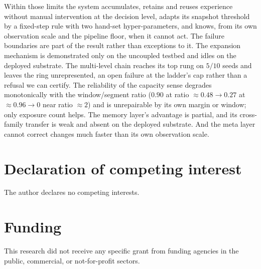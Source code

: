 \documentclass[preprint,12pt]{elsarticle}
\begin{document}
Within those limits the
system accumulates, retains and reuses experience without manual
intervention at the decision level, adapts its snapshot threshold by a
fixed-step rule with two hand-set hyper-parameters, and
knows, from its own observation scale and the pipeline floor, when it
cannot act. The failure boundaries are part of the result rather than
exceptions to it. The expansion mechanism is demonstrated only on the
uncoupled testbed and idles on the deployed substrate. The multi-level chain
reaches its top rung on $5/10$ seeds and leaves the ring unrepresented, an
open failure at the ladder's cap rather than a refusal we can certify. The
reliability of the capacity sense degrades monotonically with the
window/segment ratio ($0.90$ at ratio $\approx0.48\to0.27$ at
$\approx0.96\to0$ near ratio $\approx2$) and is unrepairable by its own
margin or window; only exposure count helps. The memory layer's advantage is partial, and
its cross-family transfer is weak and absent on the deployed substrate. And
the meta layer cannot correct changes much faster than its own observation
scale.

\section*{Declaration of competing interest}
The author declares no competing interests.

\section*{Funding}
This research did not receive any specific grant from funding agencies in
the public, commercial, or not-for-profit sectors.
\end{document}
